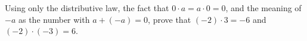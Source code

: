 Using only the distributive law, the fact that $0\cdot a=a\cdot0=0$, and the meaning of $-a$ as the number with $a+(-a)=0$, prove that $(-2)\cdot3=-6$ and $(-2)\cdot(-3)=6$.
